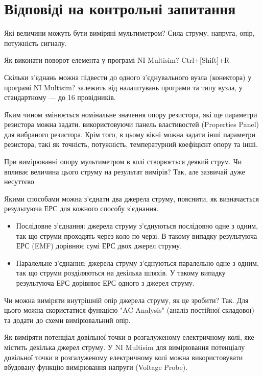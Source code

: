 \documentclass[a4paper, 12pt, oneside]{extarticle}
\begin{document}
\section*{Відповіді на контрольні запитання}
\begin{itemize}
	\question Які величини можуть бути виміряні мультиметром?
	\answer Сила струму, напруга, опір, потужність сигналу.

	\question Як виконати поворот елемента у програмі NI Multisim?
		\answer Ctrl+[Shift]+R

	\question Скільки з'єднань можна підвести до одного з'єднувального вузла (конектора) у програмі NI Multisim?
	\answer залежить від налаштувань програми та типу вузла, у стандартному --- до 16 провідників.

	\question Яким чином змінюється номінальне значення опору резистора, які ще параметри резистора можна задати.
	\answer використовуючи панель властивостей (Properties Panel) для вибраного резистора. Крім того, в цьому вікні можна задати інші параметри резистора, такі як точність, потужність, температурний коефіцієнт опору та інші.

	\question При вимірюванні опору мультиметром в колі створюється деякий струм. Чи впливає величина цього струму на результат вимірів?
	\answer Так, але зазвичай дуже несуттєво

	\question Якими способами можна з'єднати два джерела струму, пояснити, як визначається результуюча ЕРС для кожного способу з'єднання.
	\answer
		\begin{itemize}
			\item	Послідовне з'єднання: джерела струму з'єднуються послідовно одне з одним, так що струми проходять через коло по черзі. В такому випадку результуюча ЕРС (EMF) дорівнює сумі ЕРС двох джерел струму. %
			\item
Паралельне з'єднання: джерела струму з'єднуються паралельно одне з одним, так що струми розділяються на декілька шляхів. У такому випадку результуюча ЕРС дорівнює ЕРС одного з джерел струму. %
		\end{itemize}

	\question Чи можна виміряти внутрішній опір  джерела струму, як це зробити?
	\answer Так. Для цього можна скористатися функцією "AC Analysis" (аналіз постійної складової) та додати до схеми вимірювальний опір.

	\question Як виміряти потенціал довільної точки в розгалуженому електричному колі, яке містить декілька джерел струму.
	\answer У NI Multisim для вимірювання потенціалу довільної точки в розгалуженому електричному колі можна використовувати вбудовану функцію вимірювання напруги (Voltage Probe).
\end{itemize}
\end{document}
